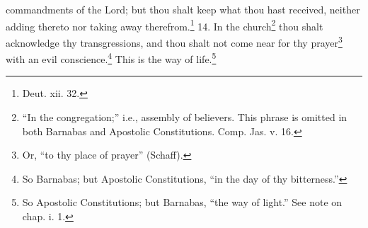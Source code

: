 commandments of the Lord; but thou shalt keep what thou hast received, neither adding thereto nor taking away therefrom.\footnote{\par  Deut. xii. 32.} 14. In the church\footnote{\par  “In the congregation;” i.e., assembly of believers. This phrase is omitted in both Barnabas and Apostolic Constitutions. Comp. Jas. v. 16.} thou shalt acknowledge thy transgressions, and thou shalt not come near for thy prayer\footnote{\par  Or, “to thy place of prayer” (Schaff).} with an evil conscience.\footnote{\par  So Barnabas; but Apostolic Constitutions, “in the day of thy bitterness.”} This is the way of life.\footnote{\par  So Apostolic Constitutions; but Barnabas, “the way of light.” See note on chap. i. 1.}


